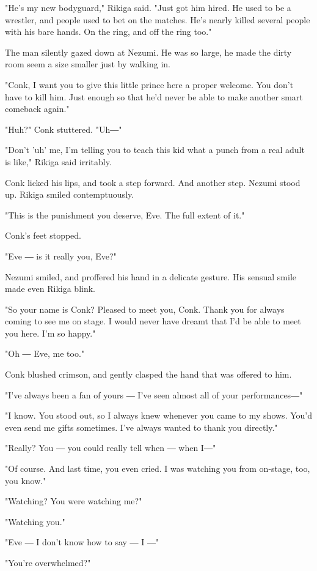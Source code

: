 "He's my new bodyguard," Rikiga said. "Just got him hired. He used to be
a wrestler, and people used to bet on the matches. He's nearly killed
several people with his bare hands. On the ring, and off the ring too."

The man silently gazed down at Nezumi. He was so large, he made the
dirty room seem a size smaller just by walking in.

"Conk, I want you to give this little prince here a proper welcome. You
don't have to kill him. Just enough so that he'd never be able to make
another smart comeback again."

"Huh?" Conk stuttered. "Uh―"

"Don't 'uh' me, I'm telling you to teach this kid what a punch from a
real adult is like," Rikiga said irritably.

Conk licked his lips, and took a step forward. And another step. Nezumi
stood up. Rikiga smiled contemptuously.

"This is the punishment you deserve, Eve. The full extent of it."

Conk's feet stopped.

"Eve ― is it really you, Eve?"

Nezumi smiled, and proffered his hand in a delicate gesture. His sensual
smile made even Rikiga blink.

"So your name is Conk? Pleased to meet you, Conk. Thank you for always
coming to see me on stage. I would never have dreamt that I'd be able to
meet you here. I'm so happy."

"Oh ― Eve, me too."

Conk blushed crimson, and gently clasped the hand that was offered to
him.

"I've always been a fan of yours ― I've seen almost all of your
performances―"

"I know. You stood out, so I always knew whenever you came to my shows.
You'd even send me gifts sometimes. I've always wanted to thank you
directly."

"Really? You ― you could really tell when ― when I―"

"Of course. And last time, you even cried. I was watching you from
on-stage, too, you know."

"Watching? You were watching me?"

"Watching you."

"Eve ― I don't know how to say ― I ―"

"You're overwhelmed?"

